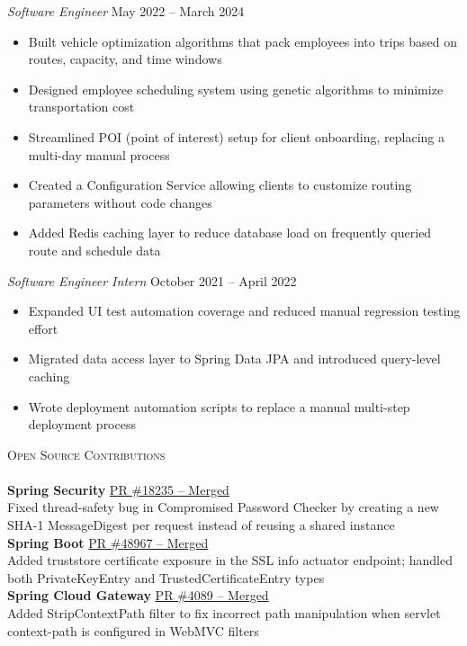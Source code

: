 \documentclass[a4paper]{article}
\newcommand{\lineunder} {
    \vspace*{-8pt} \\
    \hspace*{-18pt} \hrulefill \\
}
\newcommand{\header} [1] {
    {\hspace*{-18pt}\vspace*{6pt} \textsc{#1}}
    \vspace*{-6pt} \lineunder
}
\begin{document}
\textit{Software Engineer} \hfill May 2022 -- March 2024\\
\vspace{-1mm}
\begin{itemize} \itemsep -2pt
    \item Built vehicle optimization algorithms that pack employees into trips based on routes, capacity, and time windows
    \item Designed employee scheduling system using genetic algorithms to minimize transportation cost
    \item Streamlined POI (point of interest) setup for client onboarding, replacing a multi-day manual process
    \item Created a Configuration Service allowing clients to customize routing parameters without code changes
    \item Added Redis caching layer to reduce database load on frequently queried route and schedule data
\end{itemize}

\textit{Software Engineer Intern} \hfill October 2021 -- April 2022\\
\vspace{-1mm}
\begin{itemize} \itemsep -2pt
    \item Expanded UI test automation coverage and reduced manual regression testing effort
    \item Migrated data access layer to Spring Data JPA and introduced query-level caching
    \item Wrote deployment automation scripts to replace a manual multi-step deployment process
\end{itemize}

\header{Open Source Contributions}
\vspace{1mm}
\textbf{Spring Security} \hfill \href{https://github.com/spring-projects/spring-security/pull/18235}{PR \#18235 -- Merged}\\
Fixed thread-safety bug in Compromised Password Checker by creating a new SHA-1 MessageDigest per request instead of reusing a shared instance\\
\vspace{1mm}
\textbf{Spring Boot} \hfill \href{https://github.com/spring-projects/spring-boot/pull/48967}{PR \#48967 -- Merged}\\
Added truststore certificate exposure in the SSL info actuator endpoint; handled both PrivateKeyEntry and TrustedCertificateEntry types\\
\vspace{1mm}
\textbf{Spring Cloud Gateway} \hfill \href{https://github.com/spring-cloud/spring-cloud-gateway/pull/4089}{PR \#4089 -- Merged}\\
Added StripContextPath filter to fix incorrect path manipulation when servlet context-path is configured in WebMVC filters\\
\vspace{1mm}
\end{document}
